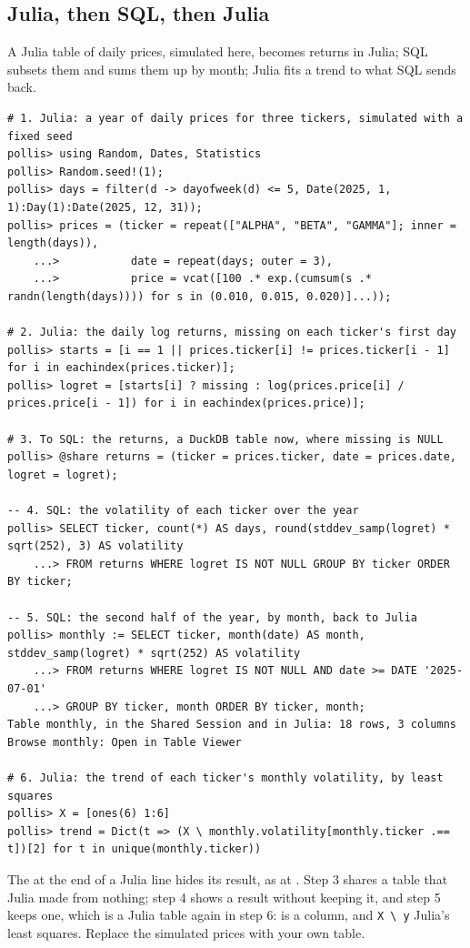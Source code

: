 \subsection{Julia, then SQL, then Julia}
A Julia table of daily prices, simulated here, becomes returns in Julia; SQL subsets them and sums them up by month;
Julia fits a trend to what SQL sends back.
\begin{lstlisting}
# 1. Julia: a year of daily prices for three tickers, simulated with a fixed seed
pollis> using Random, Dates, Statistics
pollis> Random.seed!(1);
pollis> days = filter(d -> dayofweek(d) <= 5, Date(2025, 1, 1):Day(1):Date(2025, 12, 31));
pollis> prices = (ticker = repeat(["ALPHA", "BETA", "GAMMA"]; inner = length(days)),
    ...>           date = repeat(days; outer = 3),
    ...>           price = vcat([100 .* exp.(cumsum(s .* randn(length(days)))) for s in (0.010, 0.015, 0.020)]...));

# 2. Julia: the daily log returns, missing on each ticker's first day
pollis> starts = [i == 1 || prices.ticker[i] != prices.ticker[i - 1] for i in eachindex(prices.ticker)];
pollis> logret = [starts[i] ? missing : log(prices.price[i] / prices.price[i - 1]) for i in eachindex(prices.price)];

# 3. To SQL: the returns, a DuckDB table now, where missing is NULL
pollis> @share returns = (ticker = prices.ticker, date = prices.date, logret = logret);

-- 4. SQL: the volatility of each ticker over the year
pollis> SELECT ticker, count(*) AS days, round(stddev_samp(logret) * sqrt(252), 3) AS volatility
    ...> FROM returns WHERE logret IS NOT NULL GROUP BY ticker ORDER BY ticker;

-- 5. SQL: the second half of the year, by month, back to Julia
pollis> monthly := SELECT ticker, month(date) AS month, stddev_samp(logret) * sqrt(252) AS volatility
    ...> FROM returns WHERE logret IS NOT NULL AND date >= DATE '2025-07-01'
    ...> GROUP BY ticker, month ORDER BY ticker, month;
Table monthly, in the Shared Session and in Julia: 18 rows, 3 columns
Browse monthly: Open in Table Viewer

# 6. Julia: the trend of each ticker's monthly volatility, by least squares
pollis> X = [ones(6) 1:6]
pollis> trend = Dict(t => (X \ monthly.volatility[monthly.ticker .== t])[2] for t in unique(monthly.ticker))
\end{lstlisting}
The \file{;} at the end of a Julia line hides its result, as at . Step 3 shares a table that Julia made
from nothing; step 4 shows a result without keeping it, and step 5 keeps one, which is a Julia table again in step 6:
 is a column, and \texttt{\small X \textbackslash{} y} Julia's least squares. Replace the simulated
prices with your own table.


